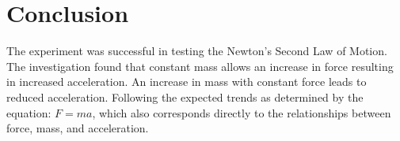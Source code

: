 \documentclass[a4paper,12pt]{article}
\begin{document}
\section{Conclusion}

The experiment was successful in testing the Newton's Second Law of Motion. The investigation found that constant mass allows an increase in force resulting in increased acceleration. An increase in mass with constant force leads to reduced acceleration. Following the expected trends as determined by the equation: \( F = ma \), which also corresponds directly to the relationships between force, mass, and acceleration.

\printbibliography
\end{document}
